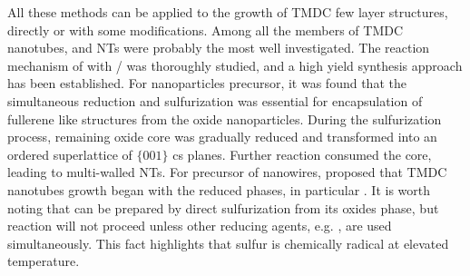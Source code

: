 All these methods can be applied to the growth of TMDC few layer structures, directly or with some modifications. Among all the members of TMDC nanotubes,  and  NTs were probably the most well investigated.\cite{Homyonfer1997,Tenne1998,Frey1998,Frey1999,Rothschild2000,Zak2000} The reaction mechanism of  with / was thoroughly studied,\cite{Feldman1998} and a high yield synthesis approach has been established.\cite{Margolin2004} For  nanoparticles precursor, it was found that the simultaneous reduction and sulfurization was essential for encapsulation of fullerene like  structures from the oxide nanoparticles. During the sulfurization process, remaining oxide core was gradually reduced and transformed into an ordered superlattice of $\{ 001 \}$ \gls{cs} planes. Further reaction consumed the  core, leading to multi-walled  NTs. For precursor of  nanowires, \citeauthor{Feldman1996} proposed that TMDC nanotubes growth began with the reduced  phases, in particular .\cite{Feldman1996} It is worth noting that  can be prepared by direct sulfurization from its oxides phase, but reaction  will not proceed unless other reducing agents, e.g. , are used simultaneously.\cite{Tsirlina1998} This fact highlights that sulfur is chemically radical at elevated temperature.

